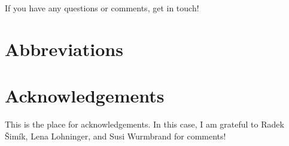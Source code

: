 If you have any questions or comments, get in touch!

\section*{Abbreviations}
\printglossary[style=inline, type=\leipzigtype]{}

\section*{Acknowledgements}

This is the place for acknowledgements. In this case, I am grateful to Radek
Šimík, Lena Lohninger, and Susi Wurmbrand for comments!

\newrefcontext[sorting=nyt]
\printbibliography



